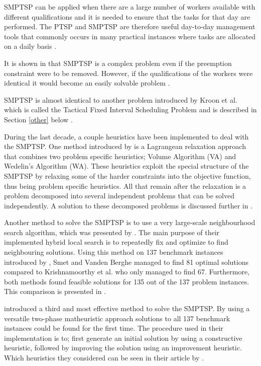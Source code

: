 SMPTSP can be applied when there are a large number of workers available with different qualifications and it is needed to ensure that the tasks for that day are performed. The PTSP and SMPTSP are therefore useful day-to-day management tools that commonly occurs in many practical instances where tasks are allocated on a daily basis \citet{krishnamoorthy_2012}.

It is shown in \citet{kroon_1995} that SMPTSP is a complex problem even if the preemption constraint were to be removed. However, if the qualifications of the workers were identical it would become an easily solvable problem \citet{krishnamoorthy_2012}.

SMPTSP is almost identical to another problem introduced by Kroon et al. which is called the Tactical Fixed Interval Scheduling Problem and is described in Section \ref{other} below \citet{krishnamoorthy_2012}.

During the last decade, a couple heuristics have been implemented to deal with the SMPTSP. One method introduced by \citet{krishnamoorthy_2012} is a Lagrangean relaxation approach that combines two problem specific heuristics; Volume Algorithm (VA) and Wedelin's Algorithm (WA). These heuristics exploit the special structure of the SMPTSP by relaxing some of the harder constraints into the objective function, thus being problem specific heuristics. All that remain after the relaxation is a problem decomposed into several independent problems that can be solved independently. A solution to these decomposed problems is discussed further in \citet{krishnamoorthy_2012}.

Another method to solve the SMPTSP is to use a very large-scale neighbourhood search algorithm, which was presented by \citet{smet_2012}. The main purpose of their implemented hybrid local search is to repeatedly fix and optimize to find neighbouring solutions. Using this method on 137 benchmark instances introduced by \citet{krishnamoorthy_2012}, Smet and Vanden Berghe managed to find 81 optimal solutions compared to Krishnamoorthy et al. who only managed to find 67. Furthermore, both methods found feasible solutions for 135 out of the 137 problem instances. This comparison is presented in \citet{smet_2014}.

\citet{smet_2014} introduced a third and most effective method to solve the SMPTSP. By using a versatile two-phase matheuristic approach solutions to all 137 benchmark instances could be found for the first time. The procedure used in their implementation is to; first generate an initial solution by using a constructive heuristic, followed by improving the solution using an improvement heuristic. Which heuristics they considered can be seen in their article by \citet{smet_2014}.


